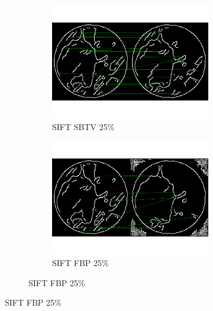 \documentclass[10pt,a4paper,titlepage]{article}
\begin{document}
\begin{figure}
\begin{figure}[H]
			\begin{subfigure}[b]{0.475\textwidth}
				\includegraphics[width=\textwidth]{Sample1/SIFT/Edges/SB/25p.png}
				\caption{SIFT SBTV 25\%}
			\end{subfigure}
			\begin{subfigure}[b]{0.475\textwidth}
				\includegraphics[width=\textwidth]{Sample1/SIFT/Edges/FBP/25p.png}
				\caption{SIFT FBP 25\%}
			\end{subfigure}
			

\end{figure}
\end{figure}
\end{document}
